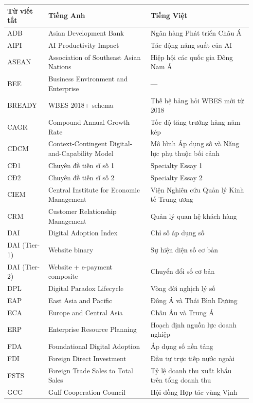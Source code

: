 \documentclass[12pt,a4paper]{article}
\begin{document}
\begin{longtable}[]{@{}lll@{}}
\toprule\noalign{}
Từ viết tắt & Tiếng Anh & Tiếng Việt \\
\midrule\noalign{}
\endhead
\bottomrule\noalign{}
\endlastfoot
ADB & Asian Development Bank & Ngân hàng Phát triển Châu Á \\
AIPI & AI Productivity Impact & Tác động năng suất của AI \\
ASEAN & Association of Southeast Asian Nations & Hiệp hội các quốc gia
Đông Nam Á \\
BEE & Business Environment and Enterprise & --- \\
BREADY & WBES 2018+ schema & Thế hệ bảng hỏi WBES mới từ 2018 \\
CAGR & Compound Annual Growth Rate & Tốc độ tăng trưởng hàng năm kép \\
CDCM & Context-Contingent Digital-and-Capability Model & Mô hình Áp dụng
số và Năng lực phụ thuộc bối cảnh \\
CĐ1 & Chuyên đề tiến sĩ số 1 & Specialty Essay 1 \\
CĐ2 & Chuyên đề tiến sĩ số 2 & Specialty Essay 2 \\
CIEM & Central Institute for Economic Management & Viện Nghiên cứu Quản
lý Kinh tế Trung ương \\
CRM & Customer Relationship Management & Quản lý quan hệ khách hàng \\
DAI & Digital Adoption Index & Chỉ số áp dụng số \\
DAI (Tier-1) & Website binary & Sự hiện diện số cơ bản \\
DAI (Tier-2) & Website + e-payment composite & Chuyển đổi số cơ bản \\
DPL & Digital Paradox Lifecycle & Vòng đời nghịch lý số \\
EAP & East Asia and Pacific & Đông Á và Thái Bình Dương \\
ECA & Europe and Central Asia & Châu Âu và Trung Á \\
ERP & Enterprise Resource Planning & Hoạch định nguồn lực doanh
nghiệp \\
FDA & Foundational Digital Adoption & Áp dụng số nền tảng \\
FDI & Foreign Direct Investment & Đầu tư trực tiếp nước ngoài \\
FSTS & Foreign Trade Sales to Total Sales & Tỷ lệ doanh thu xuất khẩu
trên tổng doanh thu \\
GCC & Gulf Cooperation Council & Hội đồng Hợp tác vùng Vịnh \\

\end{longtable}
\end{document}

